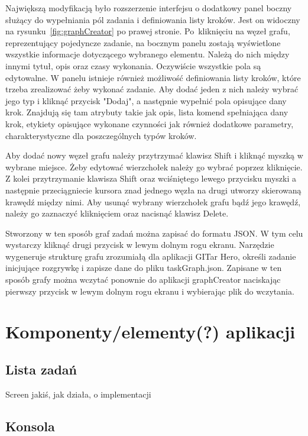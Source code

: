 \documentclass[11pt,a4paper,polish,thesis]{dcsbook}
\begin{document}
	Największą modyfikacją było rozszerzenie interfejsu o dodatkowy panel boczny służący do wypełniania pól zadania i definiowania listy kroków. Jest on widoczny na rysunku~\ref{fig:graphCreator} po prawej stronie. Po~kliknięciu na węzeł grafu, reprezentujący pojedyncze zadanie, na bocznym panelu zostają wyświetlone wszystkie informacje dotyczącego wybranego elementu. Należą do nich między innymi tytuł, opis oraz czasy wykonania. Oczywiście wszystkie pola są edytowalne. W panelu istnieje również możliwość definiowania listy kroków, które trzeba zrealizować żeby wykonać zadanie. Aby dodać jeden z nich należy wybrać jego typ i kliknąć przycisk "Dodaj", a następnie wypełnić pola opisujące dany krok. Znajdują się tam atrybuty takie jak opis, lista komend spełniająca dany krok, etykiety opisujące wykonane czynności jak również dodatkowe parametry, charakterystyczne dla poszczególnych typów kroków. 
	
	Aby dodać nowy węzeł grafu należy przytrzymać klawisz Shift i kliknąć myszką w wybrane miejsce. Żeby edytować wierzchołek należy go wybrać poprzez kliknięcie. Z kolei przytrzymanie klawisza Shift oraz wciśniętego lewego przycisku myszki a następnie przeciągniecie kursora znad jednego węzła na drugi utworzy skierowaną krawędź między nimi. Aby usunąć wybrany wierzchołek grafu bądź jego krawędź, należy go zaznaczyć kliknięciem oraz nacisnąć klawisz Delete. 
	
	Stworzony w ten sposób graf zadań można zapisać do formatu JSON. W tym celu wystarczy kliknąć drugi przycisk w lewym dolnym rogu ekranu. Narzędzie wygeneruje strukturę grafu zrozumiałą dla aplikacji GITar Hero, określi zadanie inicjujące rozgrywkę i zapisze dane do pliku taskGraph.json. Zapisane w ten sposób grafy można wczytać ponownie do aplikacji graphCreator naciskając pierwszy przycisk w lewym dolnym rogu ekranu i wybierając plik do wczytania.
	
	\section{Komponenty/elementy(?) aplikacji}
	
	\subsection{Lista zadań}
	
	Screen jakiś, jak działa, o implementacji
	
	\subsection{Konsola}
	
\end{document}
